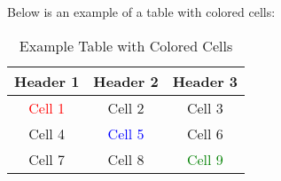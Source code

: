 \documentclass{article}
\begin{document}
Below is an example of a table with colored cells:

\begin{table}[H]
\centering
\begin{tabular}{|c|c|c|}
\hline
\rowcolor{gray!30} \textbf{Header 1} & \textbf{Header 2} & \textbf{Header 3} \\ \hline
\textcolor{red}{Cell 1}              & Cell 2            & Cell 3            \\ \hline
Cell 4                               & \textcolor{blue}{Cell 5} & Cell 6            \\ \hline
Cell 7                               & Cell 8            & \textcolor{green}{Cell 9}  \\ \hline
\end{tabular}
\caption{Example Table with Colored Cells}
\end{table}
\end{document}
